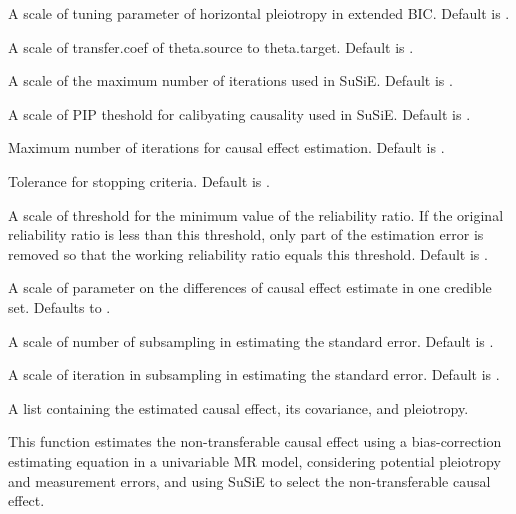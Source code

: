 \documentclass[a4paper]{book}
\begin{document}
\begin{Arguments}
\begin{ldescription}
\item[\code{ebic.gamma}] A scale of tuning parameter of horizontal pleiotropy in extended BIC. Default is .

\item[\code{transfer.coef}] A scale of transfer.coef of theta.source to theta.target. Default is .

\item[\code{susie.iter}] A scale of the maximum number of iterations used in SuSiE. Default is .

\item[\code{pip.thres}] A scale of PIP theshold for calibyating causality used in SuSiE. Default is .

\item[\code{max.iter}] Maximum number of iterations for causal effect estimation. Default is .

\item[\code{max.eps}] Tolerance for stopping criteria. Default is .

\item[\code{reliability.thres}] A scale of threshold for the minimum value of the reliability ratio. If the original reliability ratio is less than this threshold, only part of the estimation error is removed so that the working reliability ratio equals this threshold. Default is .

\item[\code{ridge.diff}] A scale of parameter on the differences of causal effect estimate in one credible set. Defaults to .

\item[\code{sampling.time}] A scale of number of subsampling in estimating the standard error. Default is .

\item[\code{sampling.iter}] A scale of iteration in subsampling in estimating the standard error. Default is .
\end{ldescription}
\end{Arguments}
%
\begin{Value}
A list containing the estimated causal effect, its covariance, and pleiotropy.
\end{Value}
%
\begin{Description}
This function estimates the non-transferable causal effect using a bias-correction estimating equation in a univariable MR model, considering potential pleiotropy and measurement errors, and using SuSiE to select the non-transferable causal effect.
\end{Description}
\end{document}
